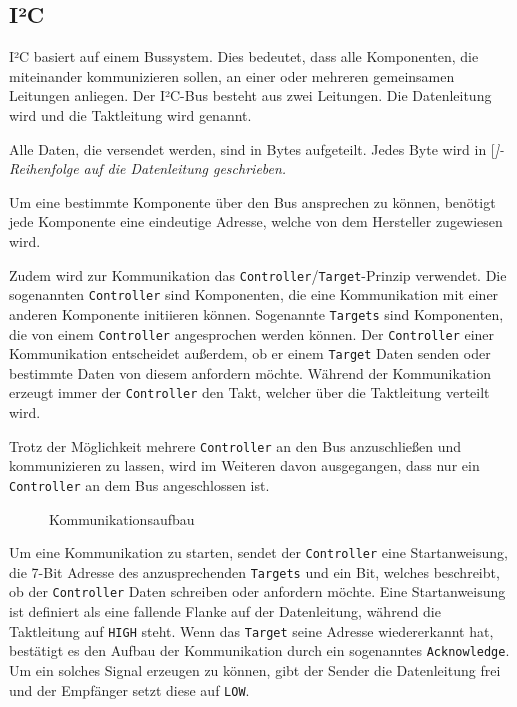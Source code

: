 \subsection{I²C}


I²C basiert auf einem Bussystem.
Dies bedeutet, dass alle Komponenten, die miteinander kommunizieren sollen, an einer oder mehreren gemeinsamen Leitungen anliegen.
Der I²C-Bus besteht aus zwei Leitungen.
Die Datenleitung wird  und die Taktleitung wird  genannt.

Alle Daten, die versendet werden, sind in Bytes aufgeteilt.
Jedes Byte wird in [\itshape]-Reihenfolge auf die Datenleitung geschrieben.

Um eine bestimmte Komponente über den Bus ansprechen zu können, benötigt jede Komponente eine eindeutige Adresse, welche von dem Hersteller zugewiesen wird.

Zudem wird zur Kommunikation das \texttt{Controller}/\texttt{Target}-Prinzip verwendet.
Die sogenannten \texttt{Controller} sind Komponenten, die eine Kommunikation mit einer anderen Komponente initiieren können.
Sogenannte \texttt{Targets} sind Komponenten, die von einem \texttt{Controller} angesprochen werden können.
Der \texttt{Controller} einer Kommunikation entscheidet außerdem, ob er einem \texttt{Target} Daten senden oder bestimmte Daten von diesem anfordern möchte.
Während der Kommunikation erzeugt immer der \texttt{Controller} den Takt, welcher über die Taktleitung verteilt wird.

Trotz der Möglichkeit mehrere \texttt{Controller} an den Bus anzuschließen und kommunizieren zu lassen, wird im Weiteren davon ausgegangen, dass nur ein \texttt{Controller} an dem Bus angeschlossen ist.

\begin{wrapfigure}{r}{.4\textwidth}
	\centering
	\scalebox{1.25}{}
	
	\caption{Kommunikationsaufbau}
	\label{i2c-start}
\end{wrapfigure}
Um eine Kommunikation zu starten, sendet der \texttt{Controller} eine Startanweisung, die 7-Bit Adresse des anzusprechenden \texttt{Targets} und ein Bit, welches beschreibt, ob der \texttt{Controller} Daten schreiben oder anfordern möchte.
Eine Startanweisung ist definiert als eine fallende Flanke auf der Datenleitung, während die Taktleitung auf \texttt{HIGH} steht.
Wenn das \texttt{Target} seine Adresse wiedererkannt hat, bestätigt es den Aufbau der Kommunikation durch ein sogenanntes \texttt{Acknowledge}.
Um ein solches Signal erzeugen zu können, gibt der Sender die Datenleitung frei und der Empfänger setzt diese auf \texttt{LOW}.

